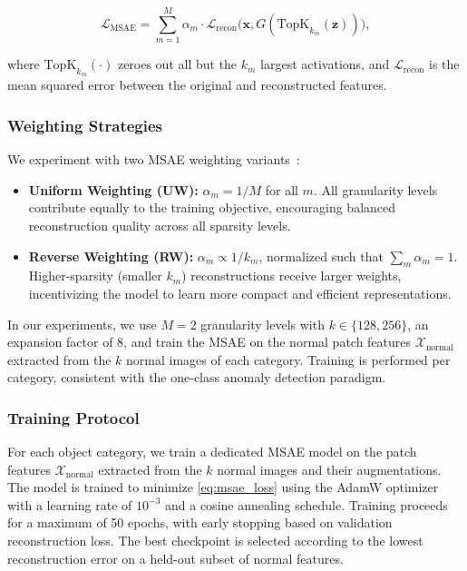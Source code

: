 \begin{equation}
    \mathcal{L}_{\text{MSAE}} = \sum_{m=1}^{M} \alpha_m \cdot \mathcal{L}_{\text{recon}}\big(\mathbf{x}, G(\text{TopK}_{k_m}(\mathbf{z}))\big),
    \label{eq:msae_loss}
\end{equation}

where $\text{TopK}_{k_m}(\cdot)$ zeroes out all but the $k_m$ largest activations, and $\mathcal{L}_{\text{recon}}$ is the mean squared error between the original and reconstructed features.

\subsubsection{Weighting Strategies}

We experiment with two MSAE weighting variants~\cite{Zaigrajew2025MSAE}:

\begin{itemize}
    \item \textbf{Uniform Weighting (UW):} $\alpha_m = 1/M$ for all $m$. All granularity levels contribute equally to the training objective, encouraging balanced reconstruction quality across all sparsity levels.
    \item \textbf{Reverse Weighting (RW):} $\alpha_m \propto 1/k_m$, normalized such that $\sum_m \alpha_m = 1$. Higher-sparsity (smaller $k_m$) reconstructions receive larger weights, incentivizing the model to learn more compact and efficient representations.
\end{itemize}

In our experiments, we use $M = 2$ granularity levels with $k \in \{128, 256\}$, an expansion factor of 8, and train the MSAE on the normal patch features $\mathcal{X}_{\text{normal}}$ extracted from the $k$ normal images of each category.
Training is performed per category, consistent with the one-class anomaly detection paradigm.

\subsubsection{Training Protocol}

For each object category, we train a dedicated MSAE model on the patch features $\mathcal{X}_{\text{normal}}$ extracted from the $k$ normal images and their augmentations.
The model is trained to minimize \cref{eq:msae_loss} using the AdamW optimizer with a learning rate of $10^{-3}$ and a cosine annealing schedule.
Training proceeds for a maximum of 50 epochs, with early stopping based on validation reconstruction loss.
The best checkpoint is selected according to the lowest reconstruction error on a held-out subset of normal features.

